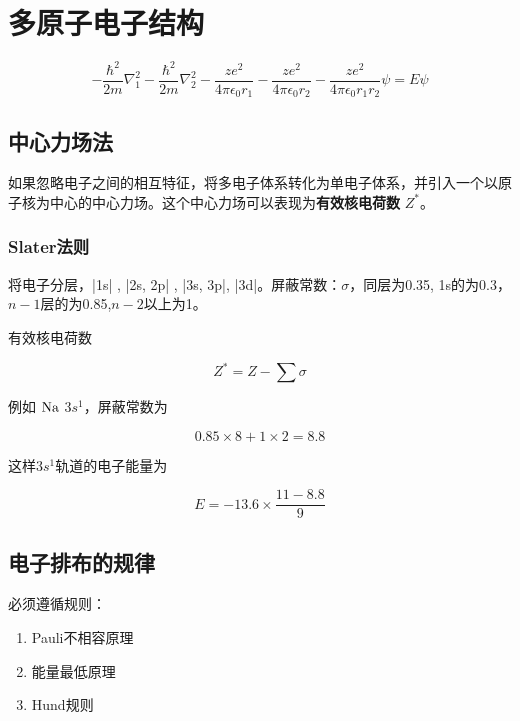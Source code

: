 \chapter{多原子电子结构}

\begin{equation*}
    -\frac{\hbar^2}{2m} \nabla_1^2 - \frac{\hbar^2}{2m} \nabla_2^2 - \frac{ze^2}{4\pi\epsilon_0r_1} - \frac{ze^2}{4\pi\epsilon_0r_2} - \frac{ze^2}{4\pi\epsilon_0r_1r_2} \psi = E\psi
\end{equation*}

\section{中心力场法}

如果忽略电子之间的相互特征，将多电子体系转化为单电子体系，并引入一个以原子核为中心的中心力场。这个中心力场可以表现为\textbf{有效核电荷数} $Z^*$。

\subsection{Slater法则}

将电子分层，|1s| , |2s, 2p| , |3s, 3p|, |3d|。屏蔽常数：$\sigma$，同层为0.35, 1s的为0.3，$n - 1$层的为0.85,$n - 2$以上为1。

有效核电荷数

\begin{equation*}
    Z^* = Z - \sum \sigma
\end{equation*}

例如 $\ce{Na}$ $3s^1$，屏蔽常数为

\begin{equation*}
    0.85 \times 8 + 1 \times 2 = 8.8
\end{equation*}

这样$3s^1$轨道的电子能量为

\begin{equation*}
    E = -13.6 \times \frac{11 - 8.8}{9}
\end{equation*}


\section{电子排布的规律}

必须遵循规则：

\begin{enumerate}
    \item Pauli不相容原理
    \item 能量最低原理
    \item Hund规则
\end{enumerate}

